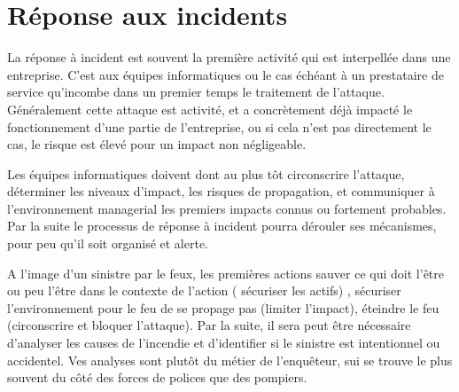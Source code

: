 \section{Réponse aux incidents}

La réponse à incident est souvent la première activité qui est interpellée dans une entreprise. C'est aux équipes informatiques ou le cas échéant à un prestataire de service qu'incombe dans un premier temps le traitement de l'attaque. Généralement cette attaque est activité, et a concrètement déjà impacté le fonctionnement d'une partie de l'entreprise, ou si cela n'est pas directement le cas, le risque est élevé pour un impact non négligeable. 

Les équipes informatiques doivent dont au plus tôt circonscrire l'attaque, déterminer les niveaux d'impact, les risques de propagation, et communiquer à l'environnement managerial les premiers impacts connus ou fortement probables.  Par la suite le processus de réponse à incident pourra dérouler ses mécanismes, pour peu qu'il soit organisé et alerte.

A l'image d'un sinistre par le feux, les premières actions sauver ce qui doit l'être ou peu l'être dans le contexte de l'action ( sécuriser les actifs) , sécuriser l'environnement pour le feu de se propage pas (limiter l'impact), éteindre le feu (circonscrire et bloquer l'attaque). Par la suite, il sera peut être nécessaire d'analyser les causes de l'incendie et d'identifier si le sinistre est intentionnel ou accidentel. Ves analyses sont plutôt du métier de l'enquêteur, sui se trouve le plus souvent du côté des forces de polices que des pompiers.

